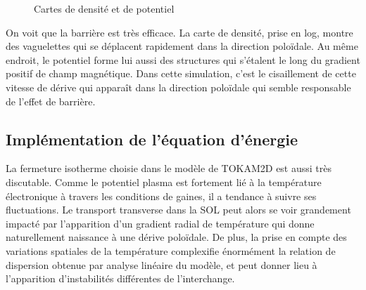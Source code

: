 \begin{refsection}
	\begin{figure}[!htbp]
    \centering
    \caption{Cartes de densité  et de potentiel
    }
    \label{2-CartesMagBarrier}
\end{figure}

On voit que la barrière est très efficace. La carte de densité, prise en log,
montre des vaguelettes qui se déplacent rapidement dans la direction poloïdale.
Au même endroit, le potentiel forme lui aussi des structures qui s'étalent le
long du gradient positif de champ magnétique. 
Dans cette simulation, c'est le cisaillement de cette vitesse de dérive qui
apparaît dans la direction poloïdale qui semble responsable de l'effet de
barrière. 


	\subsection{Implémentation de l'équation d'énergie}
	La fermeture isotherme choisie dans le modèle de TOKAM2D est aussi très
	discutable. Comme le potentiel plasma est fortement lié à la température
	électronique à travers les conditions de gaines, il a tendance à suivre ses
	fluctuations. Le transport transverse dans la SOL peut alors se voir grandement
	impacté par l'apparition d'un gradient radial de température qui donne
	naturellement naissance à une dérive poloïdale. De plus, la prise en compte des
	variations spatiales de la température complexifie énormément la relation de
	dispersion obtenue par analyse linéaire du modèle, et peut donner lieu à
	l'apparition d'instabilités différentes de l'interchange.
	

\end{refsection}
